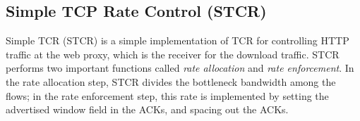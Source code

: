 \documentclass[conference]{../../IEEEtran}
\begin{document}




\subsection{Simple TCP Rate Control (STCR)}
\label{sec:htcr}



\begin{comment}
 Initially, flows are allocated a rate 

\[
A_i = \frac{B}{N}
\]
\end{comment}



Simple TCR (STCR) is a simple implementation of TCR for controlling HTTP traffic at the web proxy, which is the receiver for the download traffic. STCR performs two important functions called \emph{rate allocation} and \emph{rate enforcement}. In the rate allocation step, STCR divides the bottleneck bandwidth among the flows; in the rate enforcement step, this rate is implemented by setting the advertised window field in the ACKs, and spacing out the ACKs.
\end{document}
